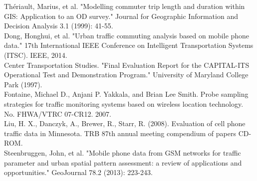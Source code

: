 \documentclass[hidelinks,12pt]{article}
\begin{document}
\noindent Thériault, Marius, et al. "Modelling commuter trip length and duration within GIS: Application to an OD survey." Journal for Geographic Information and Decision Analysis 3.1 (1999): 41-55.\\

\noindent Dong, Honghui, et al. "Urban traffic commuting analysis based on mobile phone data." 17th International IEEE Conference on Intelligent Transportation Systems (ITSC). IEEE, 2014.\\

\noindent Center Transportation Studies. "Final Evaluation Report for the CAPITAL-ITS Operational Test and Demonstration Program." University of Maryland College Park (1997).\\

\noindent Fontaine, Michael D., Anjani P. Yakkala, and Brian Lee Smith. Probe sampling strategies for traffic monitoring systems based on wireless location technology. No. FHWA/VTRC 07-CR12. 2007.\\

\noindent Liu, H. X., Danczyk, A., Brewer, R., Starr, R. (2008). Evaluation of cell phone traffic data in Minnesota. TRB 87th annual meeting compendium of papers CD-ROM.\\

\noindent Steenbruggen, John, et al. "Mobile phone data from GSM networks for traffic parameter and urban spatial pattern assessment: a review of applications and opportunities." GeoJournal 78.2 (2013): 223-243.\\


	
	\newpage
	\appendix
\end{document}
